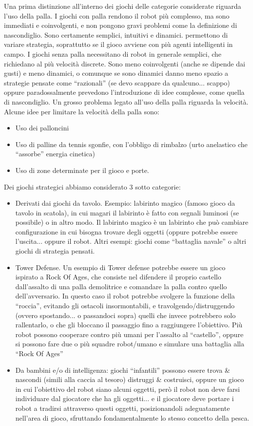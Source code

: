 Una prima distinzione all'interno dei giochi delle categorie considerate riguarda l'uso della palla.
I giochi con palla rendono il robot più complesso, ma sono immediati e coinvolgenti, e non pongono gravi problemi come la definizione di nascondiglio. Sono certamente semplici, intuitivi e dinamici. permettono di variare strategia, soprattutto se il gioco avviene con più agenti intelligenti in campo.
I giochi senza palla necessitano di robot in generale semplici, che richiedano al più velocità discrete. Sono meno coinvolgenti (anche se dipende dai gusti) e meno dinamici, o comunque se sono dinamici danno meno spazio a strategie pensate come “razionali” (se devo scappare da qualcuno... scappo) oppure paradossalmente prevedono l’introduzione di idee complesse, come quella di nascondiglio.
Un grosso problema legato all'uso della palla riguarda la velocità. Alcune idee per limitare la velocità della palla sono:
\begin{itemize}
\item Uso dei palloncini
\item Uso di palline da tennis sgonfie, con l’obbligo di rimbalzo (urto anelastico che “assorbe” energia cinetica)
\item Uso di zone determinate per il gioco e porte.
\end{itemize}

Dei giochi strategici abbiamo considerato 3 sotto categorie:
\begin{itemize}
\item Derivati dai giochi da tavolo. Esempio: labirinto magico (famoso gioco da tavolo in scatola), in cui magari il labirinto è fatto con segnali luminosi (se possibile) o in altro modo. Il labirinto magico è un labirinto che può cambiare configurazione in cui bisogna trovare degli oggetti (oppure potrebbe essere l’uscita... oppure il robot. Altri esempi: giochi come “battaglia navale” o altri giochi di strategia pensati.
\item Tower Defense. Un esempio di Tower defense potrebbe essere un gioco ispirato a Rock Of Ages, che consiste nel difendere il proprio castello dall’assalto di una palla demolitrice e comandare la palla contro quello dell’avversario. In questo caso il robot potrebbe svolgere la funzione della “roccia”, evitando gli ostacoli insormontabili, e travolgendo/distruggendo (ovvero spostando... o passandoci sopra) quelli che invece potrebbero solo rallentarlo, o che gli bloccano il passaggio fino a raggiungere l’obiettivo. Più robot possono cooperare contro più umani per l’assalto al “castello”, oppure si possono fare due o più squadre robot/umano e simulare una battaglia alla “Rock Of Ages”
\item Da bambini e/o di intelligenza: giochi “infantili” possono essere trova \& nascondi (simili alla caccia al tesoro) distruggi \& costruisci, oppure un gioco in cui l’obiettivo del robot siano alcuni oggetti, però il robot non deve farsi individuare dal giocatore che ha gli oggetti... e il giocatore deve portare i robot a tradirsi attraverso questi oggetti, posizionandoli adeguatamente nell’area di gioco, sfruttando fondamentalmente lo stesso concetto della pesca.
\end{itemize}


